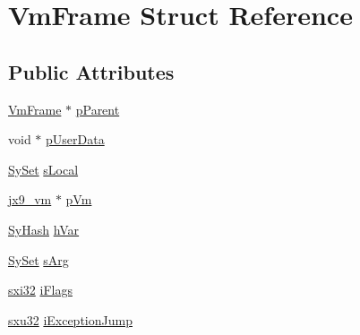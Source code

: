 \hypertarget{struct_vm_frame}{\section{Vm\-Frame Struct Reference}
\label{de/d1c/struct_vm_frame}
}
\subsection*{Public Attributes}
\begin{DoxyCompactItemize}
\item 
\hyperlink{struct_vm_frame}{Vm\-Frame} $\ast$ \hyperlink{struct_vm_frame_a52ffb5d88b9705f5ba5e74b85d58592b}{p\-Parent}
\item 
void $\ast$ \hyperlink{struct_vm_frame_a92040623bc5d65c89d09a60944f2d8e9}{p\-User\-Data}
\item 
\hyperlink{struct_sy_set}{Sy\-Set} \hyperlink{struct_vm_frame_adb499e1c681646d5f57fbe17edb8d338}{s\-Local}
\item 
\hyperlink{structjx9__vm}{jx9\-\_\-vm} $\ast$ \hyperlink{struct_vm_frame_afa8136e5cdb713195f04b7d1bbe0463f}{p\-Vm}
\item 
\hyperlink{struct_sy_hash}{Sy\-Hash} \hyperlink{struct_vm_frame_a45099db1b6879b47cafd9189eb02ae52}{h\-Var}
\item 
\hyperlink{struct_sy_set}{Sy\-Set} \hyperlink{struct_vm_frame_a8be304d99997d2077ed486f699e9b0b3}{s\-Arg}
\item 
\hyperlink{unqlite_8c_a5a58035d4ae379178e2ca46cc3272fc5}{sxi32} \hyperlink{struct_vm_frame_a62a7fce2ffba62728e7db28e5e7cb71b}{i\-Flags}
\item 
\hyperlink{unqlite_8c_abc5a8a3f345c200c98c485551f49666e}{sxu32} \hyperlink{struct_vm_frame_a012af046cac5e790a5bbc3fbe36d6e93}{i\-Exception\-Jump}
\end{DoxyCompactItemize}


